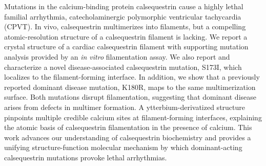 Mutations in the calcium-binding protein calsequestrin cause a highly lethal familial arrhythmia, catecholaminergic polymorphic ventricular tachycardia (CPVT). In vivo, calsequestrin multimerizes into filaments, but a compelling atomic-resolution structure of a calsequestrin filament is lacking. We report a crystal structure of a cardiac calsequestrin filament with supporting mutation analysis provided by an \textit{in vitro} filamentation assay. We also report and characterize a novel disease-associated calsequestrin mutation, S173I, which localizes to the filament-forming interface. In addition, we show that a previously reported dominant disease mutation, K180R, maps to the same multimerization surface. Both mutations disrupt filamentation, suggesting that dominant disease arises from defects in multimer formation. A ytterbium-derivatized structure pinpoints multiple credible calcium sites at filament-forming interfaces, explaining the atomic basis of calsequestrin filamentation in the presence of calcium. This work advances our understanding of calsequestrin biochemistry and provides a unifying structure-function molecular mechanism by which dominant-acting calsequestrin mutations provoke lethal arrhythmias.
